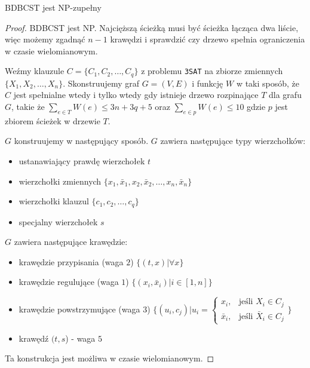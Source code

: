 \begin{theorem}
    BDBCST jest NP-zupełny

    \begin{proof}
        BDBCST jest NP. Najcięższą ścieżką musi być ścieżka łącząca dwa liście, więc możemy zgadnąć $n-1$ krawędzi i sprawdzić czy drzewo spełnia ograniczenia w czasie wielomianowym.
        
        Weźmy klauzule $C = \{C_1, C_2, \ldots, C_q\}$ z problemu \texttt{3SAT} na zbiorze zmiennych $\{X_1, X_2, \ldots, X_n\}$. Skonstruujemy graf $G = (V, E)$ i funkcję $W$ w taki sposób, że $C$ jest spełnialne wtedy i tylko wtedy gdy istnieje drzewo rozpinające $T$ dla grafu $G$, takie że $\sum_{e\in T} W(e) \leq 3n + 3q + 5$ oraz $\sum_{e\in p} W(e) \leq 10$ gdzie $p$ jest zbiorem ścieżek w drzewie $T$.

        $G$ konstruujemy w następujący sposób. $G$ zawiera następujące typy wierzchołków:
        \begin{itemize}
            \item ustanawiający prawdę wierzchołek $t$
            \item wierzchołki zmiennych $\{x_1, \bar{x}_1, x_2, \bar{x}_2, \ldots, x_n, \bar{x}_n\}$
            \item wierzchołki klauzul $\{c_1, c_2, \ldots, c_q\}$
            \item specjalny wierzchołek $s$
        \end{itemize}
        $G$ zawiera następujące krawędzie:
        \begin{itemize}
            \item krawędzie przypisania (waga $2$) $\{(t, x) | \forall x\}$
            \item krawędzie regulujące (waga $1$) $\{(x_i, \bar{x}_i) | i \in [1,n]\}$
            \item krawędzie powstrzymujące (waga $3$) $\{(u_i, c_j) | u_i = \begin{cases}
                x_i,        & \text{jeśli } X_i \in C_j\\
                \bar{x}_i,  & \text{jeśli }  \bar{X}_i \in C_j
            \end{cases}\}$
            \item krawędź $(t, s$) - waga $5$
        \end{itemize}
        Ta konstrukcja jest możliwa w czasie wielomianowym.


\end{proof}
\end{theorem}
